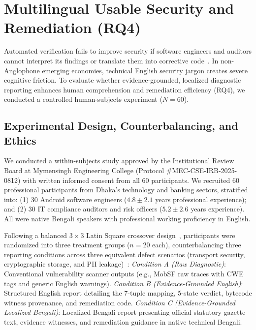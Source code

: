 \section{Multilingual Usable Security and Remediation (RQ4)}
\label{sec:usable}

Automated verification fails to improve security if software engineers and auditors cannot interpret its findings or translate them into corrective code~\cite{sasse_usable_sec, acar_developers, wash_developers}. In non-Anglophone emerging economies, technical English security jargon creates severe cognitive friction. To evaluate whether evidence-grounded, localized diagnostic reporting enhances human comprehension and remediation efficiency (RQ4), we conducted a controlled human-subjects experiment ($N=60$).

\subsection{Experimental Design, Counterbalancing, and Ethics}
\label{sec:usable:design}

We conducted a within-subjects study approved by the Institutional Review Board at Mymensingh Engineering College (Protocol \#MEC-CSE-IRB-2025-0812) with written informed consent from all 60 participants. We recruited 60 professional participants from Dhaka's technology and banking sectors, stratified into: (1) 30 Android software engineers ($4.8 \pm 2.1$ years professional experience); and (2) 30 IT compliance auditors and risk officers ($5.2 \pm 2.6$ years experience). All were native Bengali speakers with professional working proficiency in English.

Following a balanced $3 \times 3$ Latin Square crossover design~\cite{box_latin_square}, participants were randomized into three treatment groups ($n=20$ each), counterbalancing three reporting conditions across three equivalent defect scenarios (transport security, cryptographic storage, and PII leakage)~\cite{wohlin_experimentation}:
\textit{Condition A (Raw Diagnostic)}: Conventional vulnerability scanner outputs (e.g., MobSF raw traces with CWE tags and generic English warnings).
\textit{Condition B (Evidence-Grounded English)}: Structured English report detailing the 7-tuple mapping, 5-state verdict, bytecode witness provenance, and remediation code.
\textit{Condition C (Evidence-Grounded Localized Bengali)}: Localized Bengali report presenting official statutory gazette text, evidence witnesses, and remediation guidance in native technical Bengali.

